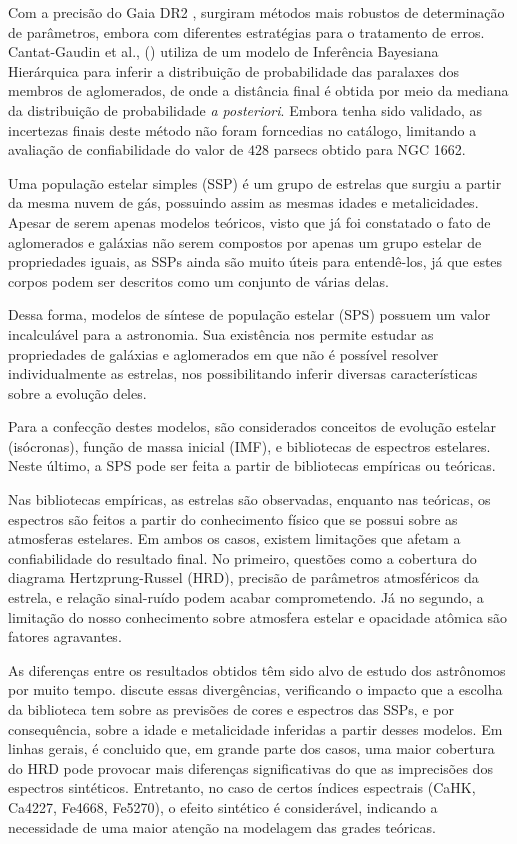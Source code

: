 \documentclass[12pt]{projeto}
\begin{document}
Com a precisão do Gaia DR2 \cite{gaia_collaboration_gaia_2018}, surgiram métodos mais robustos de determinação de parâmetros, embora com diferentes estratégias para o tratamento de erros. Cantat-Gaudin et al., (\citeyear{cantat-gaudin_painting_2020}) utiliza de um modelo de Inferência Bayesiana Hierárquica para inferir a distribuição de probabilidade das paralaxes dos membros de aglomerados, de onde a distância final é obtida por meio da mediana da distribuição de probabilidade \textit{a posteriori}. Embora tenha sido validado, as incertezas finais deste método não foram forncedias no catálogo, limitando a avaliação de confiabilidade do valor de \(428\) parsecs obtido para NGC 1662.


Uma população estelar simples (SSP) é um grupo de estrelas que surgiu a partir da mesma nuvem de gás, possuindo  assim as mesmas idades e metalicidades. Apesar de serem apenas modelos teóricos, visto que já foi constatado o fato de aglomerados e galáxias não serem compostos por apenas um grupo estelar de propriedades iguais, as SSPs ainda são muito úteis para entendê-los, já que estes corpos podem ser descritos como um conjunto de várias delas. 

Dessa forma, modelos de síntese de população estelar (SPS) possuem um valor incalculável para a astronomia. Sua existência nos permite estudar as propriedades de galáxias e aglomerados em que não é possível resolver individualmente as estrelas, nos possibilitando inferir diversas características sobre a evolução deles. \cite{BC03}

Para a confecção destes modelos, são considerados conceitos de evolução estelar (isócronas), função de massa inicial (IMF), e bibliotecas de espectros estelares. Neste último, a SPS pode ser feita a partir de bibliotecas empíricas ou teóricas. \cite{Paula2020}

Nas bibliotecas empíricas, as estrelas são observadas, enquanto nas teóricas, os espectros são feitos a partir do conhecimento físico que se possui sobre as atmosferas estelares. Em ambos os casos, existem limitações que afetam a confiabilidade do resultado final. No primeiro, questões como a cobertura do diagrama Hertzprung-Russel (HRD), precisão de parâmetros atmosféricos da estrela, e relação sinal-ruído podem acabar comprometendo. Já no segundo, a limitação do nosso conhecimento sobre atmosfera estelar e opacidade atômica são fatores agravantes.

As diferenças entre os resultados obtidos têm sido alvo de estudo dos astrônomos por muito tempo. \cite{Paula2020} discute essas divergências, verificando o impacto que a escolha da biblioteca tem sobre as previsões de cores e espectros das SSPs, e por consequência, sobre a idade e metalicidade inferidas a partir desses modelos. Em linhas gerais, é concluido que, em grande parte dos casos, uma maior cobertura do HRD pode provocar mais diferenças significativas do que as imprecisões dos espectros sintéticos. Entretanto, no caso de certos índices espectrais (CaHK, Ca4227, Fe4668, Fe5270), o efeito sintético é considerável, indicando a necessidade de uma maior atenção na modelagem das grades teóricas.
\end{document}
